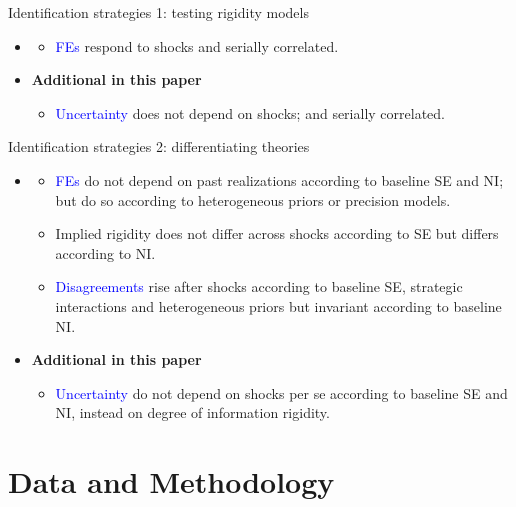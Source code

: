 \documentclass{beamer}
\begin{document}
\begin{frame}{Identification strategies 1: testing rigidity models}

\begin{itemize}
	\item\cite{coibion2012can}
	\begin{itemize}
		\item \textcolor{blue}{FEs} respond to shocks and serially correlated. 
	\end{itemize}
	\item \textbf{Additional in this paper}
	\begin{itemize}
		\item \textcolor{blue}{Uncertainty} does not depend on shocks; and serially correlated. 
	\end{itemize}
\end{itemize}

\end{frame}

\begin{frame}{Identification strategies 2: differentiating theories}
\begin{itemize}
	\item\cite{coibion2012can}
	\begin{itemize}
		\item \textcolor{blue}{FEs} do not depend on past realizations according to baseline SE and NI; but do so according to heterogeneous priors or precision models. 
		\item Implied rigidity does not differ across shocks according to SE but differs according to NI. 
		\item \textcolor{blue}{Disagreements} rise after shocks according to baseline SE, strategic interactions and heterogeneous priors but invariant according to baseline NI.
	\end{itemize}
	\item \textbf{Additional in this paper}
	\begin{itemize}
		\item \textcolor{blue}{Uncertainty} do not depend on shocks per se according to baseline SE and NI, instead on degree of information rigidity.
	\end{itemize}
\end{itemize}

\end{frame}

\section{Data and Methodology}
\end{document}
